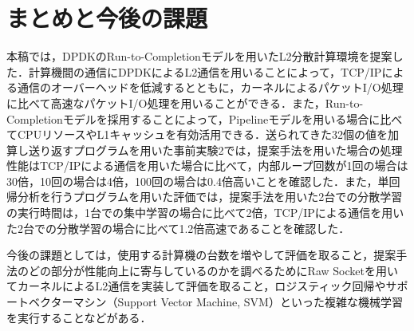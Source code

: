 \section{まとめと今後の課題}
\label{sec:Conclusion}
本稿では，DPDKのRun-to-Completionモデルを用いたL2分散計算環境を提案した．計算機間の通信にDPDKによるL2通信を用いることによって，TCP/IPによる通信のオーバーヘッドを低減するとともに，カーネルによるパケットI/O処理に比べて高速なパケットI/O処理を用いることができる．また，Run-to-Completionモデルを採用することによって，Pipelineモデルを用いる場合に比べてCPUリソースやL1キャッシュを有効活用できる．送られてきた32個の値を加算し送り返すプログラムを用いた事前実験2では，提案手法を用いた場合の処理性能はTCP/IPによる通信を用いた場合に比べて，内部ループ回数が1回の場合は30倍，10回の場合は4倍，100回の場合は0.4倍高いことを確認した．また，単回帰分析を行うプログラムを用いた評価では，提案手法を用いた2台での分散学習の実行時間は，1台での集中学習の場合に比べて2倍，TCP/IPによる通信を用いた2台での分散学習の場合に比べて1.2倍高速であることを確認した．

今後の課題としては，使用する計算機の台数を増やして評価を取ること，提案手法のどの部分が性能向上に寄与しているのかを調べるためにRaw Socketを用いてカーネルによるL2通信を実装して評価を取ること，ロジスティック回帰やサポートベクターマシン（Support Vector Machine, SVM）といった複雑な機械学習を実行することなどがある．
